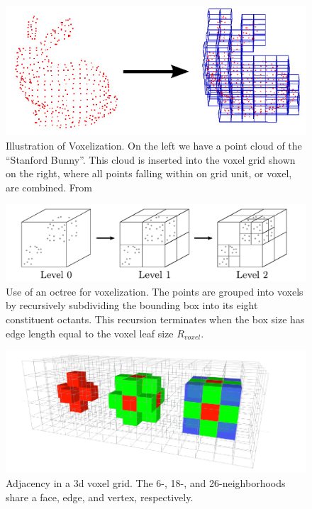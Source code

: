 \begin{figure}
\begin{center}
\includegraphics[width=0.8\linewidth]{figures/WorldModel/stanford_bunny.png}
\end{center}
   \caption[Example of Voxelization]{Illustration of Voxelization. On the left we have a point cloud of the ``Stanford Bunny''. This cloud is inserted into the voxel grid shown on the right, where all points falling within on grid unit, or voxel, are combined. From \cite{PCLWebsite}}
\label{fig:stanford_bunny}
\end{figure}

\begin{figure}
\begin{center}
\includegraphics[width=\linewidth]{figures/WorldModel/voxel_grid_octree.png}
\end{center}
   \caption[Octree Voxelization]{Use of an octree for voxelization. The points are grouped into voxels by recursively subdividing the bounding box into its eight constituent octants. This recursion terminates when the box size has edge length equal to the voxel leaf size ${R}_{voxel}$.}
\label{fig:stanford_bunny}
\end{figure}

\begin{figure}
\begin{center}
\includegraphics[width=0.9\linewidth]{figures/WorldModel/3d_nearest_neigh.png}
\end{center}
   \caption[Adjacency in a 3d Grid]{Adjacency in a 3d voxel grid. The 6-, 18-, and 26-neighborhoods share a face, edge, and vertex, respectively.}
\label{fig:3d_adjacency}
\end{figure}

